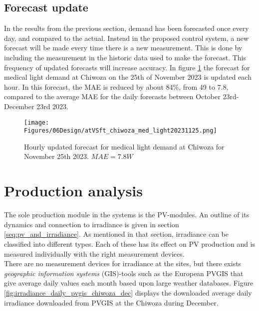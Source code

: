 \subsection{Forecast update}
In the results from the previous section, demand has been forecasted once every day, and compared to the actual. Instead in the proposed control system, a new forecast will be made every time there is a new measurement. This is done by including the measurement in the historic data used to make the forecast. This frequency of updated forecasts will increase accuracy. In figure \ref{fig:atVSft_chiwoza_med_light20231125} the forecast for medical light demand at Chiwoza on the 25th of November 2023 is updated each hour. In this forecast, the MAE is reduced by about 84\%, from 49 to 7.8, compared to the average MAE for the daily forecasts between October 23rd- December 23rd 2023.\\
 

\begin{figure}
    \centering
    \texttt{[image: Figures/06Design/atVSft\_chiwoza\_med\_light20231125.png]}
    \caption[Hourly updated forecast Chiwoza medical light]{Hourly updated forecast for medical light demand at Chiwoza for November 25th 2023. $MAE=7.8W$}
    \label{fig:atVSft_chiwoza_med_light20231125}
\end{figure}



\section{Production analysis}\label{seq:prod_analysis}

The sole production module in the systems is the PV-modules. An outline of its dynamics and connection to irradiance is given in section \ref{seq:pv_and_irradiance}. As mentioned in that section, irradiance can be classified into different types. Each of these has its effect on PV production and is measured individually with the right measurement devices.\\

There are no measurement devices for irradiance at the sites, but there exists \textit{geographic information systems} (GIS)-tools such as the European PVGIS\cite{pvgis} that give average daily values each month based upon large weather databases. Figure \ref{fig:irradiance_daily_pvgis_chiwoza_dec} displays the downloaded average daily irradiance downloaded from PVGIS at the Chiwoza during December.\\

